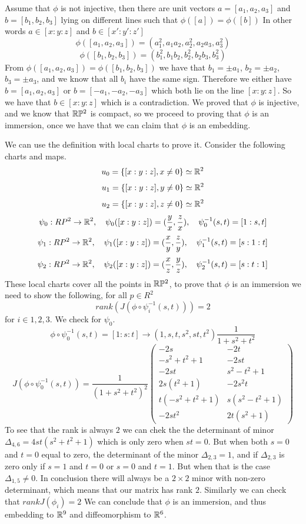 \documentclass[11pt,a4paper]{report}
\begin{document}
Assume that $\phi$ is not injective, then there are unit vectors $a = [a_1,a_2,a_3]$ and $b=[b_1,b_2,b_3]$ lying on different lines 
such that $\phi([a]) = \phi([b])$ 
In other words $a \in [x:y:z]$  and $b \in [x\prime:y\prime:z\prime]$
$$\phi([a_1,a_2,a_3]) = (a_1^2, a_1a_2, a_2^2, a_2a_3, a_3^2)$$
$$\phi([b_1,b_2,b_3]) = (b_1^2, b_1b_2, b_2^2, b_2b_3, b_3^2)$$
From $\phi([a_1,a_2,a_3]) = \phi([b_1,b_2,b_3])$ we have that $b_1 = \pm a_1$, $b_2 = \pm a_2$, $b_3 = \pm a_3$, and we know that all $b_i$ have the same sign.
Therefore  we either have $b = [a_1, a_2, a_3]$ or $b = [-a_1, -a_2,-a_3]$ which both lie on the line $[x:y:z]$. So we have that $b \in [x:y:z]$ which is a contradiction.
\newline
We proved that $\phi$ is injective, and we know that $\mathbb{R} \mathbb{P} ^2$ is compact, so we proceed to proving that $\phi$ is an immersion, 
once we have that we can claim that $\phi$ is an embedding.
\newline

We can use the definition with local charts to prove it. 
Consider the following charts and maps.
$$ u_0 =  \{ [x:y:z], x \neq 0 \} \simeq \mathbb{R}^2  $$
$$ u_1 =  \{ [x:y:z], y \neq 0 \} \simeq \mathbb{R}^2  $$
$$ u_2 = \{ [x:y:z], z \neq 0 \} \simeq \mathbb{R}^2  $$
$$ \psi_0: RP^2 \to \mathbb{R}^2, \quad
\psi_0([x:y:z]) = (\frac{y}{x}, \frac{z}{x}), \quad
\psi_0^{-1}(s,t) = [1:s,t]
$$
$$ \psi_1: RP^2 \to \mathbb{R}^2, \quad
\psi_1([x:y:z]) = (\frac{x}{y}, \frac{z}{y}), \quad
\psi_1^{-1}(s,t) = [s:1:t]
$$
$$ \psi_2: RP^2 \to \mathbb{R}^2, \quad
\psi_2([x:y:z]) = (\frac{x}{z}, \frac{y}{z}), \quad
\psi_2^{-1}(s,t) = [s:t:1]
$$
These local charts cover all the points in $\mathbb{R} \mathbb{P} ^2$, to prove that $\phi$ is an immersion
we need to show the following, for all $p \in R^2$
$$ rank(J(\phi \circ \psi_i^{-1}(s,t))) = 2 $$
for $i \in {1,2,3}$.
\newline
We check for $\psi_0$.
$$\phi \circ \psi_0^{-1}(s,t) = [1:s:t] \to (1,s,t,s^2,st,t^2) \frac{1}{1+s^2+t^2} $$
$$ J(\phi \circ \psi_0^{-1}(s,t)) = \frac{1}{(1+s^2+t^2)^2} 
\begin{pmatrix}
-2s & -2t \\
-s^2+t^2+1 & -2st \\
-2st & s^2-t^2+1 \\
2s (t^2+1) & -2 s^2 t \\
t (-s^2 + t^2 +1 ) & s (s^2 - t^2 + 1) \\
-2st^2 & 2t(s^2+1)
\end{pmatrix} 
$$
To see that the rank is always $2$ we can chek the the determinant of minor  $\Delta_{4,6} = 4 s t (s^2 + t^2 + 1)$ which is only zero when $st=0$.
But when both $s =0$ and  $t=0$ equal to zero, the determinant of the minor $\Delta_{2,3} = 1$, and if $\Delta_{2,3}$ is zero only if $s=1$ and $t=0$ or $s=0$ and $t=1$. 
But when that is the case $\Delta_{1,5} \neq 0 $. In conclusion there will always be a $2 \times 2$ minor with non-zero determinant, which means that our matrix has rank $2$.
Similarly we can check that $rank J(\phi_i) = 2$
\newline
We can conclude that $\phi$ is an immersion, and thus embedding to $\mathbb{R}^9$ and diffeomorphism to $\mathbb{R}^6$.
\end{document}
